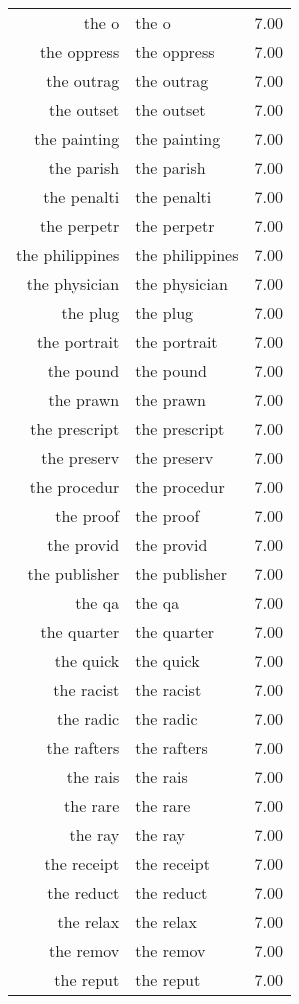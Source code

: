 \begin{table}[ht]
\begin{tabular}{rlr}
  the o & the o & 7.00 \\ 
  the oppress & the oppress & 7.00 \\ 
  the outrag & the outrag & 7.00 \\ 
  the outset & the outset & 7.00 \\ 
  the painting & the painting & 7.00 \\ 
  the parish & the parish & 7.00 \\ 
  the penalti & the penalti & 7.00 \\ 
  the perpetr & the perpetr & 7.00 \\ 
  the philippines & the philippines & 7.00 \\ 
  the physician & the physician & 7.00 \\ 
  the plug & the plug & 7.00 \\ 
  the portrait & the portrait & 7.00 \\ 
  the pound & the pound & 7.00 \\ 
  the prawn & the prawn & 7.00 \\ 
  the prescript & the prescript & 7.00 \\ 
  the preserv & the preserv & 7.00 \\ 
  the procedur & the procedur & 7.00 \\ 
  the proof & the proof & 7.00 \\ 
  the provid & the provid & 7.00 \\ 
  the publisher & the publisher & 7.00 \\ 
  the qa & the qa & 7.00 \\ 
  the quarter & the quarter & 7.00 \\ 
  the quick & the quick & 7.00 \\ 
  the racist & the racist & 7.00 \\ 
  the radic & the radic & 7.00 \\ 
  the rafters & the rafters & 7.00 \\ 
  the rais & the rais & 7.00 \\ 
  the rare & the rare & 7.00 \\ 
  the ray & the ray & 7.00 \\ 
  the receipt & the receipt & 7.00 \\ 
  the reduct & the reduct & 7.00 \\ 
  the relax & the relax & 7.00 \\ 
  the remov & the remov & 7.00 \\ 
  the reput & the reput & 7.00 \\ 

\end{tabular}
\end{table}
